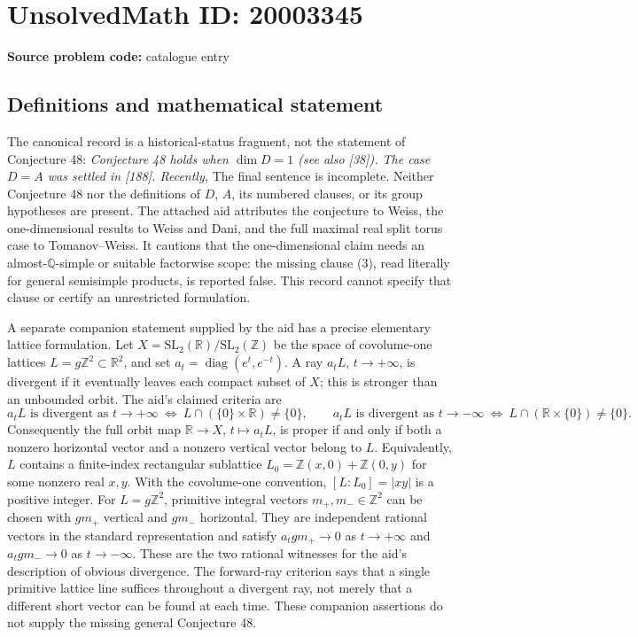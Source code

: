 \documentclass[11pt]{article}
\newcommand{\Z}{\mathbb{Z}}
\newcommand{\Q}{\mathbb{Q}}
\newcommand{\R}{\mathbb{R}}
\begin{document}
\section*{UnsolvedMath ID: 20003345}
\textbf{Source problem code:} catalogue entry
\subsection{Definitions and mathematical statement}
The canonical record is a historical-status fragment, not the statement of Conjecture 48: \emph{Conjecture 48 holds when \(\dim D=1\) (see also [38]). The case \(D=A\) was settled in [188]. Recently,} The final sentence is incomplete. Neither Conjecture 48 nor the definitions of \(D\), \(A\), its numbered clauses, or its group hypotheses are present. The attached aid attributes the conjecture to Weiss, the one-dimensional results to Weiss and Dani, and the full maximal real split torus case to Tomanov--Weiss. It cautions that the one-dimensional claim needs an almost-\(\Q\)-simple or suitable factorwise scope: the missing clause (3), read literally for general semisimple products, is reported false. This record cannot specify that clause or certify an unrestricted formulation.\par A separate companion statement supplied by the aid has a precise elementary lattice formulation. Let \(X=\mathrm{SL}_2(\R)/\mathrm{SL}_2(\Z)\) be the space of covolume-one lattices \(L=g\Z^2\subset\R^2\), and set \(a_t=\operatorname{diag}(e^t,e^{-t})\). A ray \(a_tL\), \(t\to+\infty\), is divergent if it eventually leaves each compact subset of \(X\); this is stronger than an unbounded orbit. The aid's claimed criteria are\[a_tL\text{ is divergent as }t\to+\infty\ \Longleftrightarrow\ L\cap(\{0\}\times\R)\ne\{0\},\qquad a_tL\text{ is divergent as }t\to-\infty\ \Longleftrightarrow\ L\cap(\R\times\{0\})\ne\{0\}.\] Consequently the full orbit map \(\R\to X\), \(t\mapsto a_tL\), is proper if and only if both a nonzero horizontal vector and a nonzero vertical vector belong to \(L\). Equivalently, \(L\) contains a finite-index rectangular sublattice \(L_0=\Z(x,0)+\Z(0,y)\) for some nonzero real \(x,y\). With the covolume-one convention, \([L:L_0]=|xy|\) is a positive integer. For \(L=g\Z^2\), primitive integral vectors \(m_+,m_-\in\Z^2\) can be chosen with \(gm_+\) vertical and \(gm_-\) horizontal. They are independent rational vectors in the standard representation and satisfy \(a_tgm_+\to0\) as \(t\to+\infty\) and \(a_tgm_-\to0\) as \(t\to-\infty\). These are the two rational witnesses for the aid's description of obvious divergence. The forward-ray criterion says that a single primitive lattice line suffices throughout a divergent ray, not merely that a different short vector can be found at each time. These companion assertions do not supply the missing general Conjecture 48.
\end{document}
